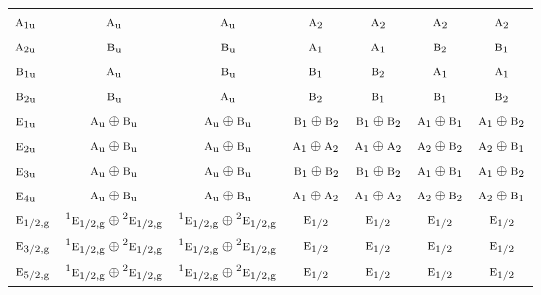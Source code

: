 \documentclass[10pt,a4paper]{article}
\numberwithin{equation}{section}
\newcommand{\irr}[1]{\text{\normalfont\scshape #1}}
\newcommand{\conjpair}[1]{{}^{#1}}
\newcommand{\ptag}[1]{\mathrm{#1}}
\begin{document}
{\begin{longtable}{@{}lcccccc@{}}
$\irr{a}_{1\ptag{u}}$ & $\irr{a}_{\ptag{u}}$ & $\irr{a}_{\ptag{u}}$ & $\irr{a}_{2}$ & $\irr{a}_{2}$ & $\irr{a}_{2}$ & $\irr{a}_{2}$\\
$\irr{a}_{2\ptag{u}}$ & $\irr{b}_{\ptag{u}}$ & $\irr{b}_{\ptag{u}}$ & $\irr{a}_{1}$ & $\irr{a}_{1}$ & $\irr{b}_{2}$ & $\irr{b}_{1}$\\
$\irr{b}_{1\ptag{u}}$ & $\irr{a}_{\ptag{u}}$ & $\irr{b}_{\ptag{u}}$ & $\irr{b}_{1}$ & $\irr{b}_{2}$ & $\irr{a}_{1}$ & $\irr{a}_{1}$\\
$\irr{b}_{2\ptag{u}}$ & $\irr{b}_{\ptag{u}}$ & $\irr{a}_{\ptag{u}}$ & $\irr{b}_{2}$ & $\irr{b}_{1}$ & $\irr{b}_{1}$ & $\irr{b}_{2}$\\
$\irr{e}_{1\ptag{u}}$ & $\irr{a}_{\ptag{u}}\oplus \irr{b}_{\ptag{u}}$ & $\irr{a}_{\ptag{u}}\oplus \irr{b}_{\ptag{u}}$ & $\irr{b}_{1}\oplus \irr{b}_{2}$ & $\irr{b}_{1}\oplus \irr{b}_{2}$ & $\irr{a}_{1}\oplus \irr{b}_{1}$ & $\irr{a}_{1}\oplus \irr{b}_{2}$\\
$\irr{e}_{2\ptag{u}}$ & $\irr{a}_{\ptag{u}}\oplus \irr{b}_{\ptag{u}}$ & $\irr{a}_{\ptag{u}}\oplus \irr{b}_{\ptag{u}}$ & $\irr{a}_{1}\oplus \irr{a}_{2}$ & $\irr{a}_{1}\oplus \irr{a}_{2}$ & $\irr{a}_{2}\oplus \irr{b}_{2}$ & $\irr{a}_{2}\oplus \irr{b}_{1}$\\
$\irr{e}_{3\ptag{u}}$ & $\irr{a}_{\ptag{u}}\oplus \irr{b}_{\ptag{u}}$ & $\irr{a}_{\ptag{u}}\oplus \irr{b}_{\ptag{u}}$ & $\irr{b}_{1}\oplus \irr{b}_{2}$ & $\irr{b}_{1}\oplus \irr{b}_{2}$ & $\irr{a}_{1}\oplus \irr{b}_{1}$ & $\irr{a}_{1}\oplus \irr{b}_{2}$\\
$\irr{e}_{4\ptag{u}}$ & $\irr{a}_{\ptag{u}}\oplus \irr{b}_{\ptag{u}}$ & $\irr{a}_{\ptag{u}}\oplus \irr{b}_{\ptag{u}}$ & $\irr{a}_{1}\oplus \irr{a}_{2}$ & $\irr{a}_{1}\oplus \irr{a}_{2}$ & $\irr{a}_{2}\oplus \irr{b}_{2}$ & $\irr{a}_{2}\oplus \irr{b}_{1}$\\
$\irr{e}_{1/2,\ptag{g}}$ & $\conjpair{1}\irr{e}_{1/2,\ptag{g}}\oplus \conjpair{2}\irr{e}_{1/2,\ptag{g}}$ & $\conjpair{1}\irr{e}_{1/2,\ptag{g}}\oplus \conjpair{2}\irr{e}_{1/2,\ptag{g}}$ & $\irr{e}_{1/2}$ & $\irr{e}_{1/2}$ & $\irr{e}_{1/2}$ & $\irr{e}_{1/2}$\\
$\irr{e}_{3/2,\ptag{g}}$ & $\conjpair{1}\irr{e}_{1/2,\ptag{g}}\oplus \conjpair{2}\irr{e}_{1/2,\ptag{g}}$ & $\conjpair{1}\irr{e}_{1/2,\ptag{g}}\oplus \conjpair{2}\irr{e}_{1/2,\ptag{g}}$ & $\irr{e}_{1/2}$ & $\irr{e}_{1/2}$ & $\irr{e}_{1/2}$ & $\irr{e}_{1/2}$\\
$\irr{e}_{5/2,\ptag{g}}$ & $\conjpair{1}\irr{e}_{1/2,\ptag{g}}\oplus \conjpair{2}\irr{e}_{1/2,\ptag{g}}$ & $\conjpair{1}\irr{e}_{1/2,\ptag{g}}\oplus \conjpair{2}\irr{e}_{1/2,\ptag{g}}$ & $\irr{e}_{1/2}$ & $\irr{e}_{1/2}$ & $\irr{e}_{1/2}$ & $\irr{e}_{1/2}$\\

\end{longtable}}
\end{document}

